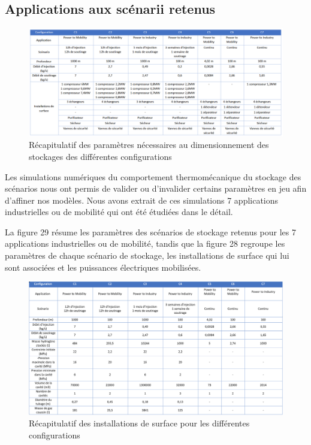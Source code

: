 \documentclass[11pt,french,a4paper]{article}
\begin{document}
\subsection{Applications aux scénarii retenus}

\begin{figure}[!h]
\centering
\includegraphics[width=0.9\linewidth]{image/chap3/Tableau 2 chap 2.4.png}
\caption{Récapitulatif des paramètres nécessaires au dimensionnement des stockages des différentes configurations }
\end{figure}

Les simulations numériques du comportement thermomécanique du stockage des scénarios nous ont permis de valider ou d'invalider certains paramètres en jeu afin d’affiner nos modèles. Nous avons extrait de ces simulations 7 applications industrielles ou de mobilité qui ont été étudiées dans le détail.

La figure 29 résume les paramètres des scénarios de stockage retenus pour les 7 applications industrielles ou de mobilité, tandis que la figure 28 regroupe les paramètres de chaque scénario de stockage, les installations de surface qui lui sont associées et les puissances électriques mobilisées.  \\

\begin{figure}[!h]
\centering
\includegraphics[width=0.9\linewidth]{image/chap3/Tableau 1 chap 2.4.png}
\caption{Récapitulatif des installations de surface pour les différentes configurations}
\end{figure}
\end{document}
